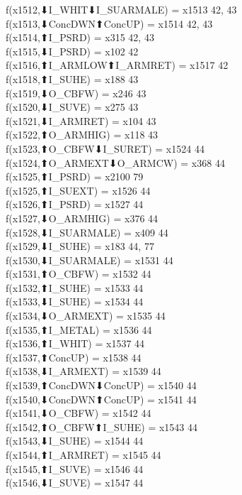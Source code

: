 f(x1512,⬇I_WHIT⬇I_SUARMALE) = x1513 {42, 43} \\
f(x1513,⬇ConcDWN⬆ConcUP) = x1514 {42, 43} \\
f(x1514,⬆I_PSRD) = x315 {42, 43} \\
f(x1515,⬇I_PSRD) = x102 {42} \\
f(x1516,⬆I_ARMLOW⬆I_ARMRET) = x1517 {42} \\
f(x1518,⬆I_SUHE) = x188 {43} \\
f(x1519,⬇O_CBFW) = x246 {43} \\
f(x1520,⬇I_SUVE) = x275 {43} \\
f(x1521,⬇I_ARMRET) = x104 {43} \\
f(x1522,⬆O_ARMHIG) = x118 {43} \\
f(x1523,⬆O_CBFW⬇I_SURET) = x1524 {44} \\
f(x1524,⬆O_ARMEXT⬇O_ARMCW) = x368 {44} \\
f(x1525,⬆I_PSRD) = x2100 {79} \\
f(x1525,⬆I_SUEXT) = x1526 {44} \\
f(x1526,⬆I_PSRD) = x1527 {44} \\
f(x1527,⬇O_ARMHIG) = x376 {44} \\
f(x1528,⬇I_SUARMALE) = x409 {44} \\
f(x1529,⬇I_SUHE) = x183 {44, 77} \\
f(x1530,⬇I_SUARMALE) = x1531 {44} \\
f(x1531,⬆O_CBFW) = x1532 {44} \\
f(x1532,⬆I_SUHE) = x1533 {44} \\
f(x1533,⬇I_SUHE) = x1534 {44} \\
f(x1534,⬇O_ARMEXT) = x1535 {44} \\
f(x1535,⬆I_METAL) = x1536 {44} \\
f(x1536,⬆I_WHIT) = x1537 {44} \\
f(x1537,⬆ConcUP) = x1538 {44} \\
f(x1538,⬇I_ARMEXT) = x1539 {44} \\
f(x1539,⬆ConcDWN⬇ConcUP) = x1540 {44} \\
f(x1540,⬇ConcDWN⬆ConcUP) = x1541 {44} \\
f(x1541,⬇O_CBFW) = x1542 {44} \\
f(x1542,⬆O_CBFW⬆I_SUHE) = x1543 {44} \\
f(x1543,⬇I_SUHE) = x1544 {44} \\
f(x1544,⬆I_ARMRET) = x1545 {44} \\
f(x1545,⬆I_SUVE) = x1546 {44} \\
f(x1546,⬇I_SUVE) = x1547 {44} \\
